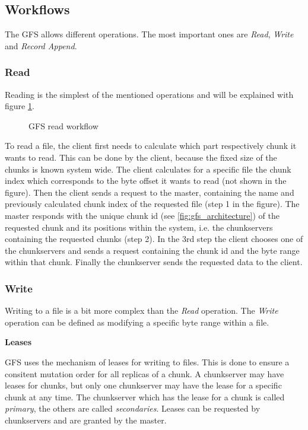 \documentclass{sig-alternate}
\begin{document}
\subsection{Workflows}
\label{gfs_workflows}
The GFS allows different operations. The most important ones are \textit{Read}, \textit{Write} and \textit{Record Append}.

\subsubsection{Read}
Reading is the simplest of the mentioned operations and will be explained with figure \ref{fig:gfs_read}.

\begin{figure}[!hbt]
\centering
{}
\caption{GFS read workflow}
\label{fig:gfs_read}
\end{figure}

To read a file, the client first needs to calculate which part respectively chunk it wants to read. This can be done by the client, because the fixed size of the chunks is known system wide. The client calculates for a specific file the chunk index which corresponds to the byte offset it wants to read (not shown in the figure).
Then the client sends a request to the master, containing the name and previously calculated chunk index of the requested file (step 1 in the figure). The master responds with the unique chunk id (see \ref{fig:gfs_architecture}) of the requested chunk and its positions within the system, i.e. the chunkservers containing the requested chunks (step 2). In the 3rd step the client chooses one of the chunkservers and sends a request containing the chunk id and the byte range within that chunk. Finally the chunkserver sends the requested data to the client.

\subsubsection{Write}
\label{gfs_write}
Writing to a file is a bit more complex than the \textit{Read} operation. The \textit{Write} operation can be defined as modifying a specific byte range within a file.

\label{leases}
\textbf{Leases}

GFS uses the mechanism of leases for writing to files. This is done to ensure a consitent mutation order for all replicas of a chunk. A chunkserver may have leases for chunks, but only one chunkserver may have the lease for a specific chunk at any time. The chunkserver which has the lease for a chunk is called \textit{primary}, the others are called \textit{secondaries}. Leases can be requested by chunkservers and are granted by the master.
\end{document}
